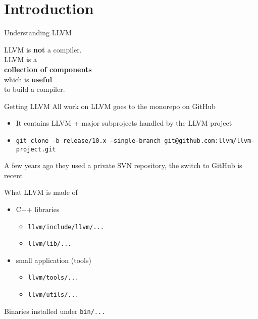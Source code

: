 
\section{Introduction}


\begin{frame}{Understanding LLVM}
	\begin{center}
	\huge{
		LLVM is \textbf{not} a compiler.\\
		\pause
		\vfill
		LLVM is a\\\textbf{collection of components}\\
		which is \textbf{useful}\\to build a compiler.
	}
	\end{center}
\end{frame}


\begin{frame}{Getting LLVM}
All work on LLVM goes to the \alert{monorepo} on GitHub\\
\bigskip
		\begin{itemize}
			\item It contains LLVM + major subprojects handled by the LLVM project
			\item \texttt{git clone -b release/10.x --single-branch git@github.com:llvm/llvm-project.git}
		\end{itemize}
\bigskip
{\small A few years ago they used a private SVN repository, the switch to GitHub is recent}
\end{frame}


\begin{frame}{What LLVM is made of}
\begin{itemize}
	\item C++ libraries
		\begin{itemize}
			\item \texttt{llvm/include/llvm/...}
			\item \texttt{llvm/lib/...}
		\end{itemize}
		\vfill
	\item small application (tools)
		\begin{itemize}
			\item \texttt{llvm/tools/...}
			\item \texttt{llvm/utils/...}
		\end{itemize}
\end{itemize}
\vfill
Binaries installed under \texttt{bin/...}
\end{frame}


